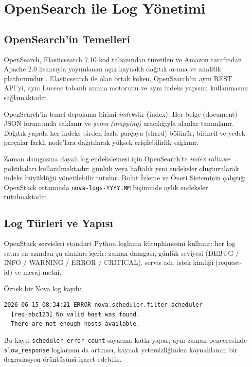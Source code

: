 \section{OpenSearch ile Log Yönetimi}
\label{sec:opensearch}

\subsection{OpenSearch'in Temelleri}

OpenSearch, Elasticsearch 7.10 kod tabanından türetilen ve Amazon tarafından Apache 2.0 lisansıyla yayımlanan açık kaynaklı dağıtık arama ve analitik platformudur \autocite{opensearch2024}.
Elasticsearch ile olan ortak köken, OpenSearch'in aynı REST API'yi, aynı Lucene tabanlı arama motorunu ve aynı indeks yapısını kullanmasını sağlamaktadır.

OpenSearch'in temel depolama birimi \textit{indeks}tir (index).
Her belge (document) JSON formatında saklanır ve \textit{şema (mapping)} aracılığıyla alanlar tanımlanır.
Dağıtık yapıda her indeks birden fazla parçaya (shard) bölünür; birincil ve yedek parçalar farklı node'lara dağıtılarak yüksek erişilebilirlik sağlanır.

Zaman damgasına dayalı log endekslemesi için OpenSearch'te \textit{index rollover} politikaları kullanılmaktadır: günlük veya haftalık yeni endeksler oluşturularak indeks büyüklüğü yönetilebilir tutulur.
Bulut İzleme ve Öneri Sisteminin çalıştığı OpenStack ortamında \texttt{nova-logs-YYYY.MM} biçiminde aylık endeksler tutulmaktadır.

\subsection{Log Türleri ve Yapısı}

OpenStack servisleri standart Python loglama kütüphanesini kullanır; her log satırı en azından şu alanları içerir: zaman damgası, günlük seviyesi (DEBUG / INFO / WARNING / ERROR / CRITICAL), servis adı, istek kimliği (request-id) ve mesaj metni.

Örnek bir Nova log kaydı:
\begin{verbatim}
2026-06-15 08:34:21 ERROR nova.scheduler.filter_scheduler
  [req-abc123] No valid host was found.
  There are not enough hosts available.
\end{verbatim}

Bu kayıt \texttt{scheduler\_error\_count} sayacına katkı yapar; aynı zaman penceresinde \texttt{slow\_response} loglarının da artması, kaynak yetersizliğinden kaynaklanan bir degradasyon örüntüsünü işaret edebilir.

